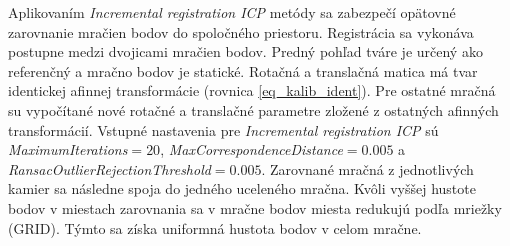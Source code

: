 Aplikovaním \textit{Incremental registration ICP} metódy sa zabezpečí opätovné zarovnanie mračien bodov do spoločného priestoru. Registrácia sa vykonáva postupne medzi dvojicami mračien bodov. Predný pohľad tváre je určený ako referenčný a mračno bodov je statické. Rotačná a translačná matica má tvar identickej afinnej transformácie (rovnica \ref{eq_kalib_ident}). Pre ostatné mračná su vypočítané nové rotačné a translačné parametre zložené z ostatných afinných transformácií. Vstupné nastavenia pre \textit{Incremental registration ICP} sú \textit{MaximumIterations}$=20$, \textit{MaxCorrespondenceDistance}$=0.005$ a \textit{RansacOutlierRejectionThreshold}$=0.005$. Zarovnané mračná z jednotlivých kamier sa následne spoja do jedného uceleného mračna. Kvôli vyššej hustote bodov v miestach zarovnania sa v mračne bodov miesta redukujú podľa mriežky (GRID). Týmto sa získa uniformná hustota bodov v celom mračne. 
